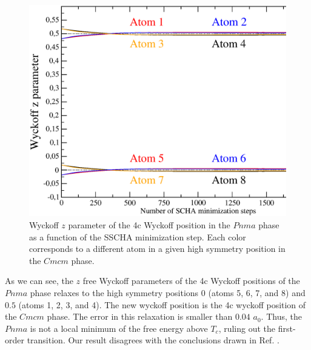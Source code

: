 \begin{figure}[h]
\begin{center}
\includegraphics[width=0.9\linewidth]{Figures/positions.eps}
	\caption[Wyckoff $z$ parameter of the 4c Wyckoff position in $Pnma$ SnSe]{Wyckoff $z$ parameter of the 4c 
	Wyckoff position in the $Pnma$ phase as a function of the SSCHA minimization step. Each color corresponds 
	to a different atom in a given high symmetry position in the $Cmcm$ phase.}
\label{atomic-relaxation}
\end{center}
\end{figure}
As we can see, the $z$ free Wyckoff parameters of the 4c Wyckoff positions of the $Pnma$ phase relaxes to the 
high symmetry positions $0$ (atoms 5, 6, 7, and 8) and $0.5$ (atoms 1, 2, 3, and 4). The new wyckoff position is the 
4c wyckoff position of the $Cmcm$ phase. The error in this relaxation is smaller than $0.04$ $a_{0}$. Thus, the 
$Pnma$ is not a local minimum of the free energy above $T_{c}$, ruling out the first-order transition. Our result 
disagrees with the conclusions drawn in Ref. \cite{dewandre2016two}. \\

